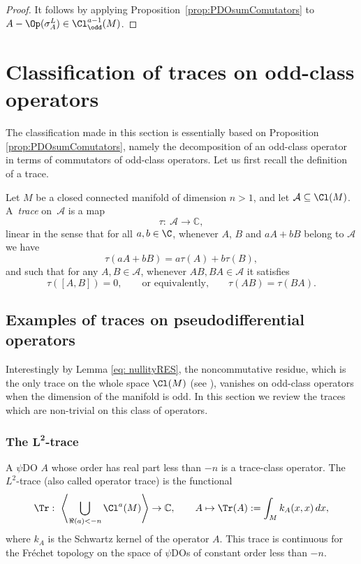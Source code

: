 \begin{proof}
It follows by applying Proposition~\ref{prop:PDOsumComutators} to $A-\Op(\sigma_A^L)\in \Cl^{a-1}_{\odd}(M)$.
\end{proof}

\section{Classif\/ication of traces on odd-class operators}\label{sectiontraces}

The classif\/ication made in this section is essentially based on Proposition \ref{prop:PDOsumComutators}, namely the decomposition of an odd-class operator in terms of commutators of odd-class operators. Let us f\/irst recall the def\/inition of a trace.

Let $M$ be a closed connected manifold of dimension $n>1$, and let $\mathcal{A}\subseteq\Cl(M)$. A~\emph{trace} on~$\mathcal{A}$ is a map
\[
\tau: \ \mathcal{A}\rightarrow\mathbb{C},
\]
linear in the sense that for all $a, b\in\C$, whenever $A$, $B$ and $aA+bB$ belong to $\mathcal{A}$ we have
\[
\tau(aA+bB)=a \tau(A)+b \tau(B),
\]
and such that for any $A,B\in\mathcal{A}$, whenever $AB,BA\in\mathcal{A}$ it satisf\/ies
\[
\tau([A,B])=0,\qquad \text{or equivalently,} \qquad \tau(AB)=\tau(BA).
\]

\subsection{Examples of traces on pseudodif\/ferential operators}

Interestingly by Lemma \ref{eq: nullityRES}, the noncommutative residue, which is the only trace on the whole space $\Cl(M)$ (see \cite{fedosov,lesch,wodzicki}), vanishes on odd-class operators when the dimension of the manifold is odd. In this section we review the traces which are non-trivial on this class of operators.

\subsubsection[The $L^2$-trace]{The $\boldsymbol{L^2}$-trace}\label{sectionL2trace}

A $\psi$DO $A$ whose order has real part less than $-n$ is a trace-class operator. The $L^2$-trace (also called operator trace) is the functional
\begin{gather}
\Tr:\ \left\langle\bigcup\limits_{\Re(a)<-n}\Cl^{a}(M)\right\rangle \to\mathbb{C},\qquad
A \mapsto\Tr(A):=\int_{M}k_A(x,x)\,dx, \label{TrL2kernel}
\end{gather}
where $k_A$ is the Schwartz kernel of the operator $A$. This trace is continuous for the Fr\'echet topology on the space of $\psi$DOs of constant order less than $-n$.

